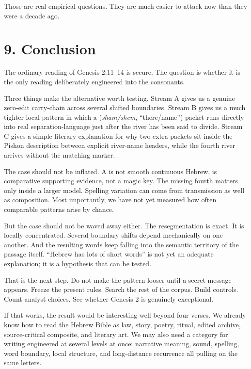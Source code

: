 Those are real empirical questions. They are much easier to attack now than they were a decade ago.

\section*{9. Conclusion}

The ordinary reading of Genesis 2:11--14 is secure. The question is whether it is the only reading deliberately engineered into the consonants.

Three things make the alternative worth testing. Stream A gives us a genuine zero-edit carry-chain across several shifted boundaries. Stream B gives us a much tighter local pattern in which a  (\textit{sham/shem}, ``there/name'') packet runs directly into real separation-language just after the river has been said to divide. Stream C gives a simple literary explanation for why two extra  packets sit inside the Pishon description between explicit river-name headers, while the fourth river arrives without the matching marker.

The case should not be inflated. A is not smooth continuous Hebrew.  is comparative supporting evidence, not a magic key. The missing fourth  matters only inside a larger model. Spelling variation can come from transmission as well as composition. Most importantly, we have not yet measured how often comparable patterns arise by chance.

But the case should not be waved away either. The resegmentation is exact. It is locally concentrated. Several boundary shifts depend mechanically on one another. And the resulting words keep falling into the semantic territory of the passage itself. ``Hebrew has lots of short words'' is not yet an adequate explanation; it is a hypothesis that can be tested.

That is the next step. Do not make the pattern looser until a secret message appears. Freeze the present rules. Search the rest of the corpus. Build controls. Count analyst choices. See whether Genesis 2 is genuinely exceptional.

If that works, the result would be interesting well beyond four verses. We already know how to read the Hebrew Bible as law, story, poetry, ritual, edited archive, source-critical composite, and literary art. We may also need a category for writing engineered at several levels at once: narrative meaning, sound, spelling, word boundary, local structure, and long-distance recurrence all pulling on the same letters.


